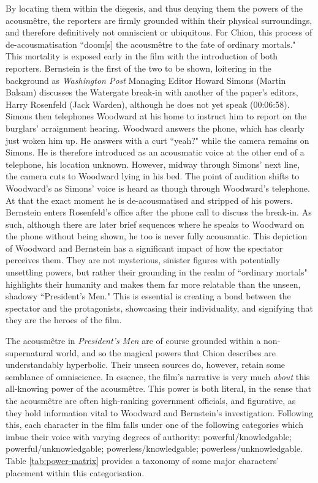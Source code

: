 By locating them within the diegesis, and thus denying them the powers of the acousmêtre, the reporters are firmly grounded within their physical surroundings, and therefore definitively not omniscient or ubiquitous.
For Chion, this process of de-acousmatisation ``doom[s] the acousmêtre to the fate of ordinary mortals."\autocites[][28]{chion_voice_1999}
This mortality is exposed early in the film with the introduction of both reporters.
Bernstein is the first of the two to be shown, loitering in the background as \textit{Washington Post} Managing Editor Howard Simons (Martin Balsam) discusses the Watergate break-in with another of the paper's editors, Harry Rosenfeld (Jack Warden), although he does not yet speak (00:06:58).
Simons then telephones Woodward at his home to instruct him to report on the burglars' arraignment hearing.
Woodward answers the phone, which has clearly just woken him up.
He answers with a curt ``yeah?" while the camera remains on Simons.
He is therefore introduced as an acousmatic voice at the other end of a telephone, his location unknown.
However, midway through Simons' next line, the camera cuts to Woodward lying in his bed.
The point of audition shifts to Woodward's as Simons' voice is heard as though through Woodward's telephone.
At that the exact moment he is de-acousmatised and stripped of his powers.
Bernstein enters Rosenfeld's office after the phone call to discuss the break-in.
As such, although there are later brief sequences where he speaks to Woodward on the phone without being shown, he too is never fully acousmatic.
This depiction of Woodward and Bernstein has a significant impact of how the spectator perceives them.
They are not mysterious, sinister figures with potentially unsettling powers, but rather their grounding in the realm of ``ordinary mortals" highlights their humanity and makes them far more relatable than the unseen, shadowy ``President's Men."
This is essential is creating a bond between the spectator and the protagonists, showcasing their individuality, and signifying that they are the heroes of the film.

The acousmêtre in \textit{President’s Men} are of course grounded within a non-supernatural world, and so the magical powers that Chion describes are understandably hyperbolic.
Their unseen sources do, however, retain some semblance of omniscience.
In essence, the film's narrative is very much \textit{about} this all-knowing power of the acousmêtre.
This power is both literal, in the sense that the acousmêtre are often high-ranking government officials, and figurative, as they hold information vital to Woodward and Bernstein's investigation.
Following this, each character in the film falls under one of the following categories which imbue their voice with varying degrees of authority: powerful/knowledgable; powerful/unknowledgable; powerless/knowledgable; powerless/unknowledgable.
Table \ref{tab:power-matrix} provides a taxonomy of some major characters' placement within this categorisation.

